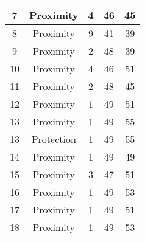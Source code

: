 \documentclass[results.tex]{subfiles}
\begin{document}
\begin{center}
\begin{tabular}{| c || c | c | c | c |}
            \hline
            7                       & Proximity                    & 4                      & 46                      & 45                   \\
            \hline
            8                       & Proximity                    & 9                      & 41                      & 39                   \\
            \hline
            9                       & Proximity                    & 2                      & 48                      & 39                   \\
            \hline
            10                      & Proximity                    & 4                      & 46                      & 51                   \\
            \hline
            11                      & Proximity                    & 2                      & 48                      & 45                   \\
            \hline
            12                      & Proximity                    & 1                      & 49                      & 51                   \\
            \hline
            13                      & Proximity                    & 1                      & 49                      & 55                   \\
            \hline
            13                      & Protection                   & 1                      & 49                      & 55                   \\
            \hline
            14                      & Proximity                    & 1                      & 49                      & 49                   \\
            \hline
            15                      & Proximity                    & 3                      & 47                      & 51                   \\
            \hline
            16                      & Proximity                    & 1                      & 49                      & 53                   \\
            \hline
            17                      & Proximity                    & 1                      & 49                      & 51                   \\
            \hline
            18                      & Proximity                    & 1                      & 49                      & 53                   \\

\end{tabular}
\end{center}
\end{document}
